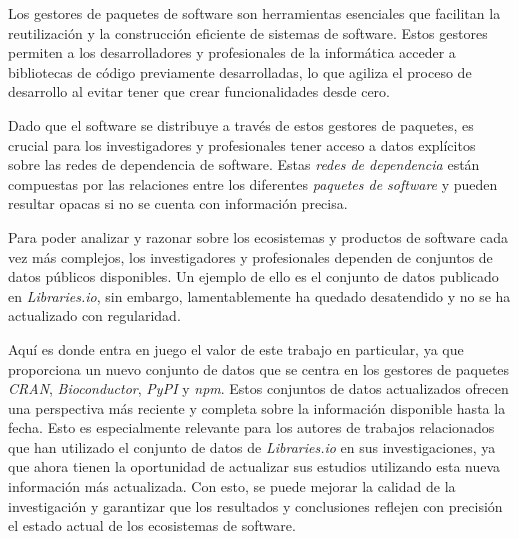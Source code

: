 
Los gestores de paquetes de software son herramientas esenciales que facilitan la reutilización y
la construcción eficiente de sistemas de software. Estos gestores permiten a los desarrolladores y
profesionales de la informática acceder a bibliotecas de código previamente desarrolladas, lo que
agiliza el proceso de desarrollo al evitar tener que crear funcionalidades desde cero.

Dado que el software se distribuye a través de estos gestores de paquetes, es crucial para los
investigadores y profesionales tener acceso a datos explícitos sobre las redes de dependencia
de software. Estas \textit{redes de dependencia} están compuestas por las relaciones entre los
diferentes \textit{paquetes de software} y pueden resultar opacas si no se cuenta con información precisa.

Para poder analizar y razonar sobre los ecosistemas y productos de software cada vez más
complejos, los investigadores y profesionales dependen de conjuntos de datos públicos disponibles.
Un ejemplo de ello es el conjunto de datos publicado en \textit{Libraries.io}, sin embargo,
lamentablemente ha quedado desatendido y no se ha actualizado con regularidad.

Aquí es donde entra en juego el valor de este trabajo en particular, ya que proporciona un nuevo
conjunto de datos que se centra en los gestores de paquetes \textit{CRAN}, \textit{Bioconductor},
\textit{PyPI} y \textit{npm}. Estos conjuntos de datos actualizados ofrecen una perspectiva más
reciente y completa sobre la información disponible hasta la fecha. Esto es especialmente relevante
para los autores de trabajos relacionados que han utilizado el conjunto de datos de \textit{Libraries.io}
en sus investigaciones, ya que ahora tienen la oportunidad de actualizar sus estudios utilizando
esta nueva información más actualizada. Con esto, se puede mejorar la calidad de la investigación
y garantizar que los resultados y conclusiones reflejen con precisión el estado actual de los
ecosistemas de software.

